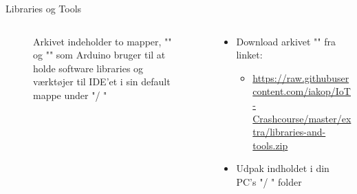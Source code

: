 \documentclass[aspectratio=169]{beamer}
\begin{document}
\begin{frame}{Libraries og Tools}
\begin{columns}
\begin{column}{0.5\textwidth}
\begin{figure}
\begin{columns}
\begin{column}{0.5\textwidth}
  				\end{column}
  			\end{columns}
  			\caption{Arkivet indeholder to mapper, "" og "" som Arduino bruger til at holde software libraries og værktøjer til IDE'et i sin default mappe under "/ "}
  			\label{fig:libraries-and-tools}
		\end{figure}
	\end{column}
	\begin{column}{0.5\textwidth}
		\begin{textBox}
			\begin{itemize}
				\item Download arkivet "" fra linket:
				\begin{itemize}
					\item \tiny\url{https://raw.githubusercontent.com/iakop/IoT-Crashcourse/master/extra/libraries-and-tools.zip}
				\end{itemize}
				\item Udpak indholdet i din PC's "/ " folder
			\end{itemize}
		\end{textBox}
	\end{column}
\end{columns}
\end{frame}
\end{document}
